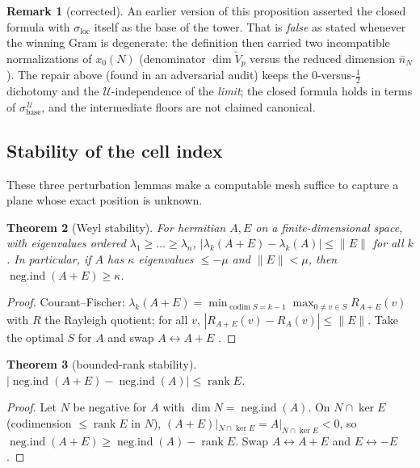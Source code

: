 \documentclass[11pt,reqno]{amsart}
\newtheorem{theorem}{Theorem}[section]
\theoremstyle{definition}
\newtheorem{remark}[theorem]{Remark}
\newcommand{\negind}{\operatorname{neg.ind}}
\newcommand{\rank}{\operatorname{rank}}
\newcommand{\half}{\tfrac12}
\begin{document}
\begin{remark}[corrected]\label{rem:radical-bug}
An earlier version of this proposition asserted the closed formula with
\(\sigma_{\mathrm{loc}}\) itself as the base of the tower. That is \emph{false}
as stated whenever the winning Gram is degenerate: the definition then carried
two incompatible normalizations of \(x_0(N)\) (denominator
\(\dim\tilde V_p\) versus the reduced dimension \(\bar n_N\)). The repair above
(found in an adversarial audit) keeps the \(0\)-versus-\(\half\)
dichotomy and the \(\mathcal U\)-independence of the \emph{limit}; the closed
formula holds in terms of \(\sigma_{\mathrm{base}}^{\,\mathcal U}\), and the
intermediate floors are not claimed canonical.
\end{remark}

\subsection{Stability of the cell index}
These three perturbation lemmas make a computable mesh suffice to capture a plane
whose exact position is unknown.

\begin{theorem}[Weyl stability]\label{thm:weyl-stab}
For hermitian \(A,E\) on a finite-dimensional space, with eigenvalues ordered
\(\lambda_1\geq\dots\geq\lambda_n\), \(|\lambda_k(A+E)-\lambda_k(A)|\leq\|E\|\)
for all \(k\). In particular, if \(A\) has \(\kappa\) eigenvalues \(\leq-\mu\)
and \(\|E\|<\mu\), then \(\negind(A+E)\geq\kappa\).
\end{theorem}

\begin{proof}
Courant--Fischer: \(\lambda_k(A+E)=\min_{\operatorname{codim}S=k-1}
\max_{0\neq v\in S}R_{A+E}(v)\) with \(R\) the Rayleigh quotient; for all \(v\),
\(|R_{A+E}(v)-R_A(v)|\leq\|E\|\). Take the optimal \(S\) for \(A\) and swap
\(A\leftrightarrow A+E\) \cite{Bhatia}.
\end{proof}

\begin{theorem}[bounded-rank stability]\label{thm:rank-stab}
\(|\negind(A+E)-\negind(A)|\leq\rank E\).
\end{theorem}

\begin{proof}
Let \(N\) be negative for \(A\) with \(\dim N=\negind(A)\). On
\(N\cap\ker E\) (codimension \(\leq\rank E\) in \(N\)),
\((A+E)|_{N\cap\ker E}=A|_{N\cap\ker E}<0\), so
\(\negind(A+E)\geq\negind(A)-\rank E\). Swap \(A\leftrightarrow A+E\) and
\(E\leftrightarrow-E\).
\end{proof}
\end{document}
